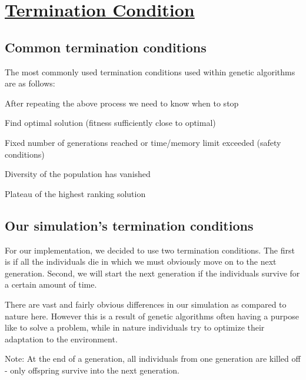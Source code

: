 \newpage
\section{\underline{Termination Condition}}

\subsection{Common termination conditions}
The most commonly used termination conditions used within genetic
algorithms are as follows:
\bi
\item After repeating the above process we need to know when to stop
\item Find optimal solution (fitness sufficiently close to optimal)
\item Fixed number of generations reached or time/memory limit exceeded
(safety conditions)
\item Diversity of the population has vanished
\item Plateau of the highest ranking solution
\ei

\subsection{Our simulation's termination conditions}
For our implementation, we decided to use two termination conditions.
The first is if all the individuals die in which we must obviously move
on to the next generation. Second, we will start the next generation if the 
individuals survive for a certain amount of time.

\ms
There are vast and fairly obvious differences in our simulation as
compared to nature here. However this is a result of genetic algorithms 
often having a purpose like to solve a problem, while in nature individuals
try to optimize their adaptation to the environment.

\bi
\item Note: At the end of a generation, all individuals from one generation are killed off - only offspring survive into the next generation.
\ei